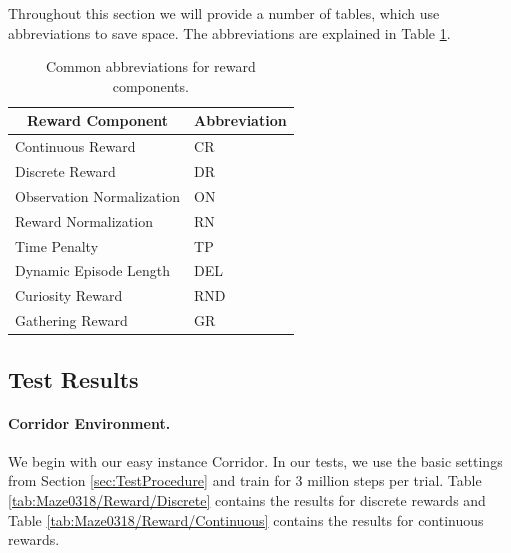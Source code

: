 Throughout this section we will provide a number of tables, which use abbreviations to save space. The abbreviations are explained in Table \ref{tab:RewardAbbreviations}.  
\vspace{1cm}
\begin{table} [ht]
    \begin{center}
        \begin{tabular}{ll}
            \toprule
            \multicolumn{1}{c}{Reward Component} & Abbreviation \\
            \midrule
            Continuous Reward & CR \\
            Discrete Reward & DR \\
            Observation Normalization & ON \\
            Reward Normalization & RN \\
            Time Penalty & TP \\
            Dynamic Episode Length & DEL \\
            Curiosity Reward & RND \\
            Gathering Reward & GR \\
            \bottomrule
        \end{tabular}
    \end{center}
    \caption[Abbreviations for Reward Components]{Common abbreviations for reward components.} \label{tab:RewardAbbreviations}
\end{table}


\subsection{Test Results} \label{sec:RewardTestResults}

\paragraph{Corridor Environment.}
We begin with our easy instance Corridor. In our tests, we use the basic settings from Section \ref{sec:TestProcedure} and train for 3 million steps per trial. Table \ref{tab:Maze0318/Reward/Discrete} contains the results for discrete rewards and Table \ref{tab:Maze0318/Reward/Continuous} contains the results for continuous rewards.

